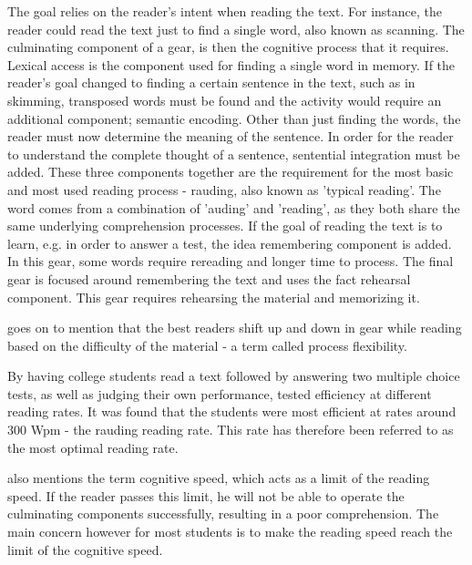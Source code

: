 The goal relies on the reader's intent when reading the text. For instance, the reader could read the text just to find a single word, also known as scanning. The culminating component of a gear, is then the cognitive process that it requires. Lexical access is the component used for finding a single word in memory. If the reader's goal changed to finding a certain sentence in the text, such as in skimming, transposed words must be found and the activity would require an additional component; semantic encoding. Other than just finding the words, the reader must now determine the meaning of the sentence. In order for the reader to understand the complete thought of a sentence, sentential integration must be added. These three components together are the requirement for the most basic and most used reading process - rauding, also known as 'typical reading'. The word comes from a combination of 'auding' and 'reading', as they both share the same underlying comprehension processes. If the goal of reading the text is to learn, e.g. in order to answer a test, the idea remembering component is added. In this gear, some words require rereading and longer time to process. The final gear is focused around remembering the text and uses the fact rehearsal component. This gear requires rehearsing the material and memorizing it. 

\cite{carver_reading_1992} goes on to mention that the best readers shift up and down in gear while reading based on the difficulty of the material - a term called process flexibility. 

By having college students read a text followed by answering two multiple choice tests, as well as judging their own performance, \cite{carver_reading_1992} tested efficiency at different reading rates. It was found that the students were most efficient at rates around 300 Wpm - the rauding reading rate. This rate has therefore been referred to as the most optimal reading rate.

\cite{carver_reading_1992} also mentions the term cognitive speed, which acts as a limit of the reading speed. If the reader passes this limit, he will not be able to operate the culminating components successfully, resulting in a poor comprehension. The main concern however for most students is to make the reading speed reach the limit of the cognitive speed.

